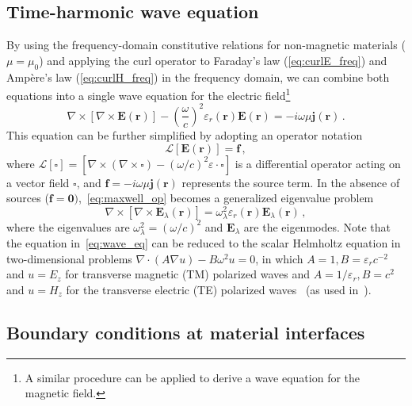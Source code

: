 \subsection*{Time-harmonic wave equation}
By using the frequency-domain constitutive relations for non-magnetic materials ($\mu=\mu_0$) and applying the curl
operator to Faraday's law (\eqref{eq:curlE_freq}) and Ampère's law
(\eqref{eq:curlH_freq}) in the frequency domain,
we can combine both equations into a single wave equation for the electric
field\footnote{A similar procedure can be applied to derive a wave equation
for the magnetic field.}
\begin{equation}\label{eq:wave_eq}
       \nabla \times \left[\nabla \times
\mathbf{E}(\mathbf{r})\right] - \left( \frac{\omega}{c} \right)^2
       \varepsilon_r(\mathbf{r}) \mathbf{E}(\mathbf{r}) = -i\omega \mu
\mathbf{j}(\mathbf{r})\,.
   \end{equation}
This equation can be further simplified by adopting an operator notation
\begin{equation}\label{eq:maxwell_op}
      \mathcal{L}[\mathbf{E}(\mathbf{r})] = \mathbf{f}\,,
\end{equation}
where $\mathcal{L}[\square] = [ \nabla \times \left( \nabla \times
\mathbf{\square} \right) - \left(\omega/c \right)^2 \varepsilon\cdot \square] $ is a differential
operator acting on a vector field $\mathbf{\square}$,
and $\mathbf{f} = -i\omega \mu \mathbf{j}(\mathbf{r})$ represents the source
term. In the absence of sources ($\mathbf{f}=\mathbf{0})$,~\eqref{eq:maxwell_op} becomes a generalized eigenvalue problem
\begin{equation}\label{eq:gen_eigen}
   \nabla \times \left[\nabla \times
   \mathbf{E}_\lambda(\mathbf{r})\right] = \omega_\lambda^2 \varepsilon_r(\mathbf{r}) \mathbf{E}_\lambda(\mathbf{r})\,,
\end{equation}
where the eigenvalues are $\omega_\lambda^2=(\omega/c)^2$ and $\mathbf{E}_\lambda$ are the eigenmodes. Note that the equation in~\eqref{eq:wave_eq} can be reduced to the scalar Helmholtz equation in
two-dimensional problems $\nabla \cdot(A \nabla u) - B \omega^2 u=0$, in which
$A=1, B=\varepsilon_r c^{-2}$ and $u=E_z$ for
transverse magnetic (TM) polarized waves and $A=1 / \varepsilon_r, B=c^2$ and
$u=H_z$ for the transverse electric (TE) polarized waves~\cite{jensen_review} (as used in~\cite{ownpub2}).

    \subsection*{Boundary conditions at material interfaces}

